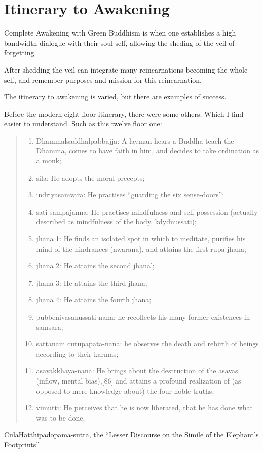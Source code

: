 \part{Itinerary to Awakening}
\label{awakening}

Complete Awakening with Green Buddhism is when one 
establishes a high bandwidth dialogue with their soul self,
allowing the sheding of the veil of forgetting.

After shedding the veil can integrate many reincarnations becoming the whole self,
and remember purposes and mission for this reincarnation.

The itinerary to awakening is varied, but there are examples of success.

Before the modern eight floor itinerary, there were some others. Which I find
easier to understand. Such as this twelve floor one:

\blockquote{\begin{enumerate}
  \item  Dhammalsaddhalpabbajja: A layman hears a Buddha teach the Dhamma, comes to have faith in him, and decides to take ordination as a monk;
  \item  sila: He adopts the moral precepts;
  \item  indriyasamvara: He practises ``guarding the six sense-doors'';
  \item  sati-sampajanna: He practises mindfulness and self-possession (actually described as mindfulness of the body, kdydnussati);
  \item  jhana 1: He finds an isolated spot in which to meditate, purifies his mind of the hindrances (nwarana), and attains the first rupa-jhana;
  \item  jhana 2: He attains the second jhana';
  \item  jhana 3: He attains the third jhana;
  \item  jhana 4: He attains the fourth jhana;
  \item  pubbenivasanussati-nana: he recollects his many former existences in samsara;
  \item  sattanam cutupapata-nana: he observes the death and rebirth of beings according to their karmas;
  \item  asavakkhaya-nana: He brings about the destruction of the asavas (inflow, mental bias),[86] and attains a profound realization of (as opposed to mere knowledge about) the four noble truths;
  \item  vimutti: He perceives that he is now liberated, that he has done what was to be done.
\end{enumerate}}{CulaHatthipadopama-sutta, the ``Lesser Discourse on the Simile of
the Elephant's Footprints''}

